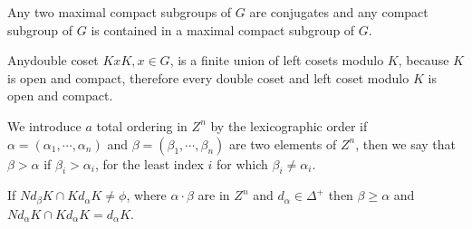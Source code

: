 \begin{corollary}
  Any two maximal compact subgroups of $G$ are conjugates and any
  compact subgroup of $G$ is contained in a maximal compact subgroup
  of $G$. 
\end{corollary}

\begin{remark}
  Any\pageoriginale double coset  $K x K, x  \in G$, is a finite union of left
  cosets modulo $K$, because $K$ is open and compact, therefore every
  double coset and left coset modulo $K$  is open and compact. 
\end{remark}	

We introduce $a$ total ordering in $Z^n$ by  the lexicographic order
\iec  if $ \alpha  = ( \alpha  _1,  \cdots, \alpha  _n )$ and $\beta =
( \beta_1,  \cdots,  \beta_n)$    are two elements of $Z^n$, then we
say that $\beta > \alpha  $ if $\beta_i > \alpha_i$, for the least
index $i$ for which $\beta_i \neq \alpha_i$. 

\begin {proposition}\label{part2:chap2:sec2:prop3}
  If $Nd _\beta K \cap Kd_ \alpha  K  \neq  \phi$, where $\alpha \cdot
   \beta$ are in  $Z^n$ and  $d_\alpha  \in \Delta^+$ then $\beta \ge
  \alpha $ and $Nd_\alpha  K \cap K d_\alpha  K = d_\alpha  K$. 
\end {proposition}

